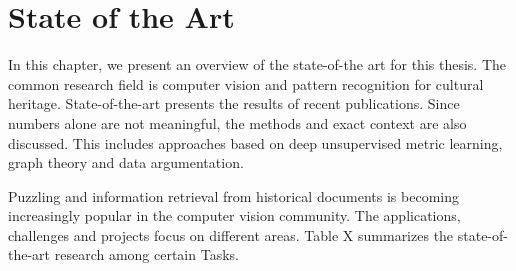\chapter{State of the Art}

In this chapter, we present an overview of the state-of-the art for this thesis. The common research field is computer vision and pattern recognition for cultural heritage. State-of-the-art presents the results of recent publications. Since numbers alone are not meaningful, the methods and exact context are also discussed. This includes approaches based on deep unsupervised metric learning, graph theory and data argumentation. 

Puzzling and information retrieval from historical documents is becoming increasingly popular in the computer vision community. The applications, challenges and projects focus on different areas. Table X summarizes the state-of-the-art research among certain Tasks.

